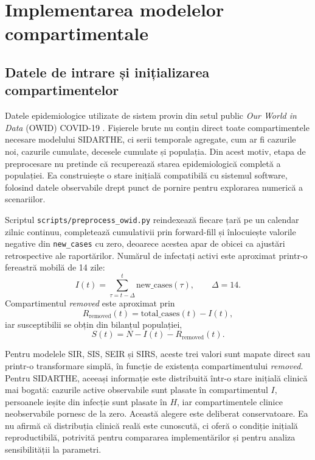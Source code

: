
\chapter{Implementarea modelelor compartimentale}
\label{ch:implementare}

\section{Datele de intrare și inițializarea compartimentelor}
\label{sec:seturi_date}

Datele epidemiologice utilizate de sistem provin din setul public
\emph{Our World in Data} (OWID) COVID-19 \cite{owid_covid}. Fișierele brute
nu conțin direct toate compartimentele necesare modelului SIDARTHE, ci serii
temporale agregate, cum ar fi cazurile noi, cazurile cumulate, decesele
cumulate și populația. Din acest motiv, etapa de preprocesare nu pretinde că
recuperează starea epidemiologică completă a populației. Ea construiește o
stare inițială compatibilă cu sistemul software, folosind datele observabile
drept punct de pornire pentru explorarea numerică a scenariilor.

Scriptul \texttt{scripts/preprocess\_owid.py} reindexează fiecare țară pe un
calendar zilnic continuu, completează cumulativii prin forward-fill și înlocuiește
valorile negative din \texttt{new\_cases} cu zero, deoarece acestea apar de obicei
ca ajustări retrospective ale raportărilor. Numărul de infectați activi este
aproximat printr-o fereastră mobilă de 14 zile:
\begin{equation}
I(t) = \sum_{\tau=t-\Delta}^{t} \text{new\_cases}(\tau), \qquad \Delta = 14.
\end{equation}
Compartimentul \emph{removed} este aproximat prin
\begin{equation}
R_{\text{removed}}(t)=\text{total\_cases}(t)-I(t),
\end{equation}
iar susceptibilii se obțin din bilanțul populației,
\begin{equation}
S(t)=N-I(t)-R_{\text{removed}}(t).
\end{equation}

Pentru modelele SIR, SIS, SEIR și SIRS, aceste trei valori sunt mapate direct sau
printr-o transformare simplă, în funcție de existența compartimentului
\emph{removed}. Pentru SIDARTHE, aceeași informație este distribuită
într-o stare inițială clinică mai bogată: cazurile active observabile sunt plasate în
compartimentul $I$, persoanele ieșite din infecție sunt plasate în $H$, iar
compartimentele clinice neobservabile pornesc de la zero. Această alegere este
deliberat conservatoare. Ea nu afirmă că distribuția clinică reală este cunoscută,
ci oferă o condiție inițială reproductibilă, potrivită pentru compararea
implementărilor și pentru analiza sensibilității la parametri.

